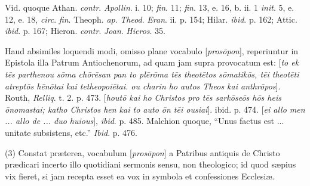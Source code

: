 Vid. quoque Athan. \emph{contr}. \emph{Apollin}.
i. 10; \emph{fin}. 11; \emph{fin}. 13, e. 16, b. ii. 1 \emph{init}. 5,
e. 12, e. 18, \emph{circ}. \emph{fin}. Theoph. \emph{ap}. \emph{Theod}.
\emph{Eran}. ii. p. 154; Hilar. \emph{ibid}. p. 162; Attic. \emph{ibid}.
p. 167; Hieron. \emph{contr}. \emph{Joan}. \emph{Hieros}. 35.

Haud absimiles loquendi modi, omisso plane
vocabulo [\emph{pros\={o}pon}], reperiuntur in Epistola illa Patrum
Antiochenorum, ad quam jam supra provocatum est: [\emph{to ek t\={e}s
parthenou s\={o}ma ch\={o}r\={e}san pan to pl\={e}r\={o}ma
t\={e}s theot\={e}tos s\={o}matik\={o}s, t\={e}i theot\={e}ti
atrept\={o}s h\={e}n\={o}tai kai tetheopoi\={e}tai. ou
charin ho autos Theos kai anthr\={o}pos}]. Routh, \emph{Relliq}.
t. 2. p. 473. [\emph{hout\={o} kai ho Christos pro t\={e}s
sark\={o}se\={o}s h\={o}s heis \={o}nomastai; katho
Christos hen kai to auto \={o}n t\={e}i ousiai}]. ibid. p.
474. [\emph{ei allo men ... allo de ... duo huious}], \emph{ibid}. p.
485. Malchion quoque, ``Unus factus est ... unitate subsistens, etc.'' \emph{Ibid}.
p. 476.

(3) Constat præterea, vocabulum [\emph{pros\={o}pon}]
a Patribus antiquis de Christo prædicari incerto illo quotidiani
sermonis sensu, non theologico; id quod sæpius vix fieret, si jam
recepta esset ea vox in symbola et confessiones Ecclesiæ.

